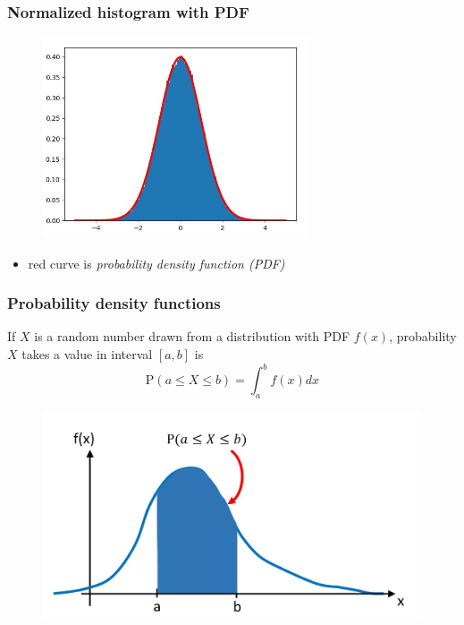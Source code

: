\documentclass[english,14pt]{beamer}
\newcommand\red[1]{{\color{red} #1}}
\begin{document}

\begin{frame}[fragile]

\frametitle{Normalized histogram with PDF}

\begin{figure}[ht]
	\centering
	\includegraphics[width=0.7\textwidth]{figures/histWithpdf}
\end{figure}

\vspace*{-5mm}

\begin{itemize}
	\item[] red curve is \red{\emph{probability density function (PDF)}}
\end{itemize}

\end{frame}


\begin{frame}[fragile]

\frametitle{Probability density functions}

If $X$ is a random number drawn from a distribution with PDF $f(x)$, probability $X$ takes a value in interval $[a,b]$ is
\vspace*{-2mm}
\[
	\boxed{
\mathrm{P}(a \leq X \leq b) = \int_a^b f(x) dx}
\]
\vspace*{-5mm}
\begin{figure}[ht]
	\centering
	\includegraphics[width=.7\textwidth]{figures/genericPDF}
\end{figure}

\end{frame}
\end{document}
